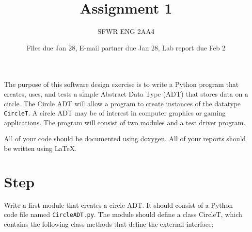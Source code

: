 \documentclass[12pt]{article}
\title{Assignment 1}
\author{SFWR ENG 2AA4}
\date{Files due Jan 28, E-mail partner due Jan 28, Lab report due Feb 2}
\newcounter{stepnum}
\begin{document}

\maketitle

The purpose of this software design exercise is to write a Python program that
creates, uses, and tests a simple Abstract Data Type (ADT) that stores data on a
circle.  The Circle ADT will allow a program to create instances of the datatype
{\tt CircleT}.  A circle ADT may be of interest in computer graphics or gaming
applications.  The program will consist of two modules and a test driver
program.

All of your code should be documented using doxygen.  All of your reports should
be written using LaTeX.

\section *{Step  \thestepnum}

Write a first module that creates a circle ADT.  It should consist of a Python code
file named {\tt CircleADT.py}.  The module should define a class CircleT, which
contains the following class methods that define the external interface:
\end{document}
